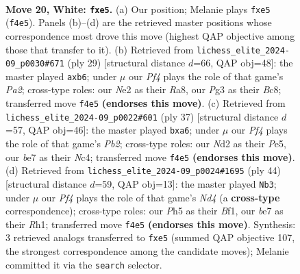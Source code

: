 \documentclass[11pt]{article}
\begin{document}
\clearpage

\begin{figure}[p]\centering
\begin{subfigure}{0.46\textwidth}\centering
\resizebox{\linewidth}{!}{%
\newchessgame
\chessboard[
  setfen={rnb1k2r/pp2b1pp/8/3ppp1P/5P2/6P1/P2NN3/R1B1K2R w KQ - 0 20},
  showmover=false,
  pgfstyle=straightmove, color=movearrow, markmove={f4-e5}
]}
\caption{}
\end{subfigure}\hfill
\begin{subfigure}{0.46\textwidth}\centering
\resizebox{\linewidth}{!}{%
\newchessgame
\chessboard[
  setfen={r1b2rk1/p2n1ppp/1P2p3/n7/4P3/P1P1BP2/6PP/1R2KBNR b K - 0 15},
  showmover=false,
  pgfstyle=straightmove, color=movearrow, markmove={a7-b6}
]}
\caption{}
\end{subfigure}
\\[4pt]
\begin{subfigure}{0.46\textwidth}\centering
\resizebox{\linewidth}{!}{%
\newchessgame
\chessboard[
  setfen={r2k3r/pp5p/P1pn4/4p3/2n5/2P2B2/2P2PPP/R1B1K2R b KQ - 0 19},
  showmover=false,
  pgfstyle=straightmove, color=movearrow, markmove={b7-a6}
]}
\caption{}
\end{subfigure}\hfill
\begin{subfigure}{0.46\textwidth}\centering
\resizebox{\linewidth}{!}{%
\newchessgame
\chessboard[
  setfen={rnb5/pp2p2k/7p/2r2p2/3N1NpP/4P3/nP1R1PP1/4KB1R w K - 2 23},
  showmover=false,
  pgfstyle=straightmove, color=movearrow, markmove={d4-b3}
]}
\caption{}
\end{subfigure}
\caption{\textbf{Move 20, White: \texttt{fxe5}.} (a) Our position; Melanie plays \texttt{fxe5} (\texttt{f4e5}). Panels (b)--(d) are the retrieved master positions whose correspondence most drove this move (highest QAP objective among those that transfer to it). (b) Retrieved from \texttt{lichess\_elite\_2024-09\_p0030\#671} (ply 29) [structural distance $d$=66, QAP obj=48]: the master played \texttt{axb6}; under $\mu$ our \emph{Pf4} plays the role of that game's \emph{Pa2}; cross-type roles: our \emph{N}e2 as their \emph{R}a8, our \emph{P}g3 as their \emph{B}c8; transferred move \texttt{f4e5} \textbf{(endorses this move)}. (c) Retrieved from \texttt{lichess\_elite\_2024-09\_p0022\#601} (ply 37) [structural distance $d$=57, QAP obj=46]: the master played \texttt{bxa6}; under $\mu$ our \emph{Pf4} plays the role of that game's \emph{Pb2}; cross-type roles: our \emph{N}d2 as their \emph{P}e5, our \emph{b}e7 as their \emph{N}c4; transferred move \texttt{f4e5} \textbf{(endorses this move)}. (d) Retrieved from \texttt{lichess\_elite\_2024-09\_p0024\#1695} (ply 44) [structural distance $d$=59, QAP obj=13]: the master played \texttt{Nb3}; under $\mu$ our \emph{Pf4} plays the role of that game's \emph{Nd4} (a \textbf{cross-type} correspondence); cross-type roles: our \emph{P}h5 as their \emph{B}f1, our \emph{b}e7 as their \emph{R}h1; transferred move \texttt{f4e5} \textbf{(endorses this move)}. Synthesis: 3 retrieved analogs transferred to \texttt{fxe5} (summed QAP objective 107, the strongest correspondence among the candidate moves); Melanie committed it via the \texttt{search} selector.}
\label{fig:thought-m38}
\end{figure}
\end{document}
